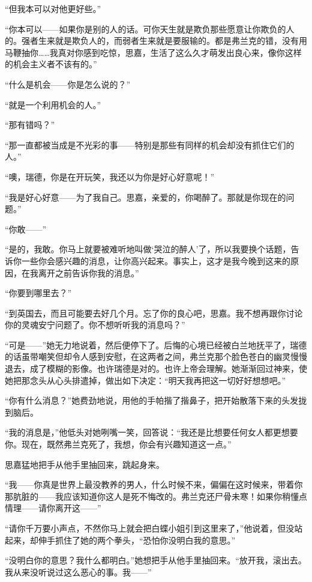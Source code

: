 \par “但我本可以对他更好些。”
\par “你本可以——如果你是别的人的话。可你天生就是欺负那些愿意让你欺负的人的。强者生来就是欺负人的，而弱者生来就是要服输的。都是弗兰克的错，没有用马鞭抽你……我真对你感到吃惊，思嘉，生活了这么久才萌发出良心来，像你这样的机会主义者不该有的。”
\par “什么是机会——你是怎么说的？”
\par “就是一个利用机会的人。”
\par “那有错吗？”
\par “那一直都被当成是不光彩的事——特别是那些有同样的机会却没有抓住它们的人。”
\par “噢，瑞德，你是在开玩笑，我还以为你是好心好意呢！”
\par “我是好心好意——为了我自己。思嘉，亲爱的，你喝醉了。那就是你现在的问题。”
\par “你敢——”
\par “是的，我敢。你马上就要被难听地叫做‘哭泣的醉人’了，所以我要换个话题，告诉你一些你会感兴趣的消息，让你高兴起来。事实上，这才是我今晚到这来的原因，在我离开之前告诉你我的消息。”
\par “你要到哪里去？”
\par “到英国去，而且可能要去好几个月。忘了你的良心吧，思嘉。我不想再跟你讨论你的灵魂安宁问题了。你不想听听我的消息吗？”
\par “可是——”她无力地说着，然后便停下了。后悔的心境已经被白兰地抚平了，瑞德的话虽带嘲笑但却令人感到安慰，在这两者之间，弗兰克那个脸色苍白的幽灵慢慢退去，成了模糊的影像。也许瑞德是对的。也许上帝会理解。她渐渐回过神来，使她把那念头从心头排遣掉，做出如下决定：“明天我再把这一切好好想想吧。”
\par “你有什么消息？”她费劲地说，用他的手帕揩了揩鼻子，把开始散落下来的头发拢到脑后。
\par “我的消息是，”他低头对她咧嘴一笑，回答说：“我还是比想要任何女人都更想要你。现在，既然弗兰克死了，我想，你会有兴趣知道这一点。”
\par 思嘉猛地把手从他手里抽回来，跳起身来。
\par “我——你真是世界上最没教养的男人，什么时候不来，偏偏在这时候来，带着你那肮脏的——我应该知道你这人是死不悔改的。弗兰克还尸骨未寒！如果你稍懂点情理——请你离开这——”
\par “请你千万要小声点，不然你马上就会把白蝶小姐引到这里来了，”他说着，但没站起来，却伸手抓住了她的两个拳头，“恐怕你没明白我的意思。”
\par “没明白你的意思？我什么都明白。”她想把手从他手里抽回来。“放开我，滚出去。我从来没听说过这么恶心的事。我——”
